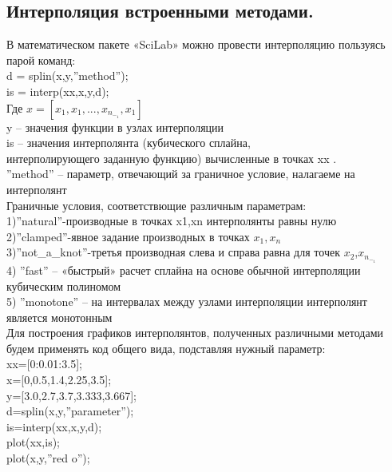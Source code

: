 \documentclass[russian,utf8,nocolumnxxxi,nocolumnxxxii]{eskdtext}
\begin{document}
\newpage      
\subsection{Интерполяция встроенными методами.}
\begin{flushleft}
В математическом пакете «SciLab» можно провести интерполяцию пользуясь парой команд:\\
d = splin(x,y,”method”);\\
is = interp(xx,x,y,d);\\
Где $x=[x_1,x_1,...,x_n_-_1,x_1]$\\
y – значения функции в узлах интерполяции\\
is – значения интерполянта (кубического сплайна,\\ интерполирующего заданную функцию) вычисленные в точках xx .\\
”method” – параметр, отвечающий за граничное условие, налагаеме на интерполянт\\
Граничные условия, соответствющие различным параметрам:\\
1)”natural”-производные в точках x1,xn интерполянты равны нулю\\
2)”clamped”-явное задание производных в точках $x_1,x_n$\\
3)”not\_a\_knot”-третья производная слева и справа равна для точек $x_2$,$x_n_-_1$\\
4) ”fast” – «быстрый» расчет сплайна на основе обычной интерполяции кубическим полиномом\\
5) ”monotone” – на интервалах между узлами интерполяции интерполянт является монотонным\\
Для построения графиков интерполянтов, полученных различными методами будем применять код общего вида, подставляя нужный параметр:\\
xx=[0:0.01:3.5];\\
x=[0,0.5,1.4,2.25,3.5];\\
y=[3.0,2.7,3.7,3.333,3.667];\\
d=splin(x,y,”parameter”);\\
is=interp(xx,x,y,d);\\
plot(xx,is);\\
plot(x,y,”red o”);\\
\end{flushleft}
\end{document}
